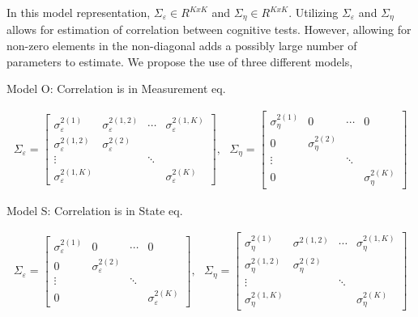 \documentclass[
]{article}
\begin{document}
In this model representation, \(\Sigma_\varepsilon \in R^{KxK}\) and \(\Sigma_\eta \in R^{KxK}\). Utilizing \(\Sigma_\varepsilon\) and \(\Sigma_\eta\) allows for estimation of correlation between cognitive tests. However, allowing for non-zero elements in the non-diagonal adds a possibly large number of parameters to estimate. We propose the use of three different models,

Model O: Correlation is in Measurement eq.

\begin{equation*}
\begin{aligned}
\Sigma_\varepsilon =
\begin{bmatrix}
\sigma^{2(1)}_\varepsilon & \sigma^{2(1,2)}_\varepsilon & \cdots & \sigma^{2(1, K)}_\varepsilon\\
\sigma^{2(1,2)}_\varepsilon & \sigma^{2(2)}_\varepsilon\\
\vdots & & \ddots\\
\sigma^{2(1, K)}_\varepsilon & & &\sigma^{2(K)}_\varepsilon
\end{bmatrix},
\ \ \ 
\Sigma_\eta = 
\begin{bmatrix}
\sigma^{2(1)}_\eta & 0 & \cdots & 0\\
0 & \sigma^{2(2)}_\eta\\
\vdots & & \ddots\\
0 & & &\sigma^{2(K)}_\eta
\end{bmatrix}
\end{aligned}
\end{equation*}

Model S: Correlation is in State eq.

\begin{equation*}
\begin{aligned}
\Sigma_\varepsilon = 
\begin{bmatrix}
\sigma^{2(1)}_\varepsilon & 0 & \cdots & 0\\
0 & \sigma^{2(2)}_\varepsilon\\
\vdots & & \ddots\\
0 & & &\sigma^{2(K)}_\varepsilon
\end{bmatrix},
\ \ \ 
\Sigma_\eta =
\begin{bmatrix}
\sigma^{2(1)}_\eta & \sigma^{2(1,2)} & \cdots & \sigma^{2(1, K)}_\eta\\
\sigma^{2(1,2)}_\eta & \sigma^{2(2)}_\eta\\
\vdots & & \ddots\\
\sigma^{2(1, K)}_\eta & & &\sigma^{2(K)}_\eta
\end{bmatrix}
\end{aligned}
\end{equation*}
\end{document}
